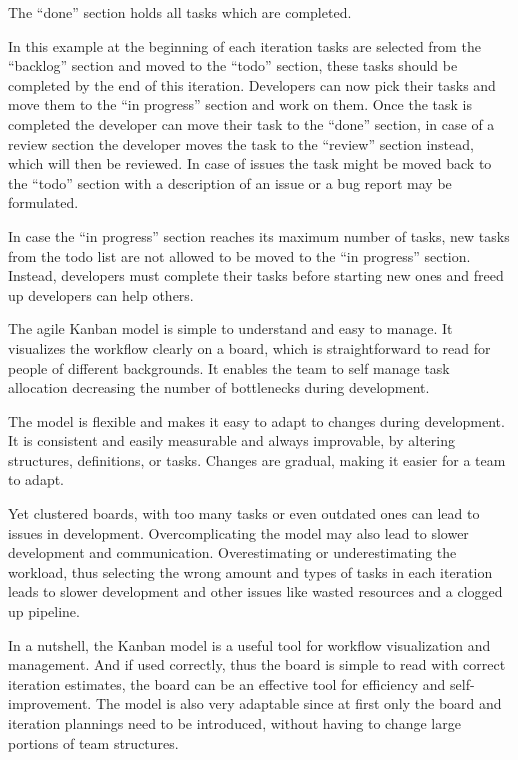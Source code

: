 \documentclass[runningheads]{llncs}
\begin{document}
The “done” section holds all tasks which are completed.

In this example at the beginning of each iteration tasks are selected from the “backlog” section and moved to the “todo” section, 
these tasks should be completed by the end of this iteration. Developers can now pick their tasks and move them to the “in progress” 
section and work on them. Once the task is completed the developer can move their task to the “done” section, in case of a review section 
the developer moves the task to the “review” section instead, which will then be reviewed. In case of issues the task might be moved back 
to the “todo” section with a description of an issue or a bug report may be formulated.

In case the “in progress” section reaches its maximum number of tasks, new tasks from the todo list are not allowed to be moved to the 
“in progress” section. Instead, developers must complete their tasks before starting new ones and freed up developers can help others. 

The agile Kanban model is simple to understand and easy to manage. It visualizes the workflow clearly on a board, which 
is straightforward to read for people of different backgrounds. It enables the team to self manage task allocation decreasing 
the number of bottlenecks during development.

The model  is flexible and makes it easy to adapt to changes during development. It is consistent and easily measurable and always 
improvable, by altering structures, definitions, or tasks. Changes are gradual, making it easier for a team to adapt.

Yet clustered boards, with too many tasks or even outdated ones can lead to issues in development. Overcomplicating the model may 
also lead to slower development and communication. Overestimating or underestimating the workload, thus selecting the wrong amount and
types of tasks in each iteration leads to slower development and other issues like wasted resources and a clogged up pipeline.

In a nutshell, the Kanban model is a useful tool for workflow visualization and management. And if used correctly, thus the board is simple to read 
with correct iteration estimates, the board can be an effective tool for efficiency and self-improvement. The model is also very adaptable 
since at first only the board and iteration plannings need to be introduced, without having to change large portions of team structures.
\end{document}
